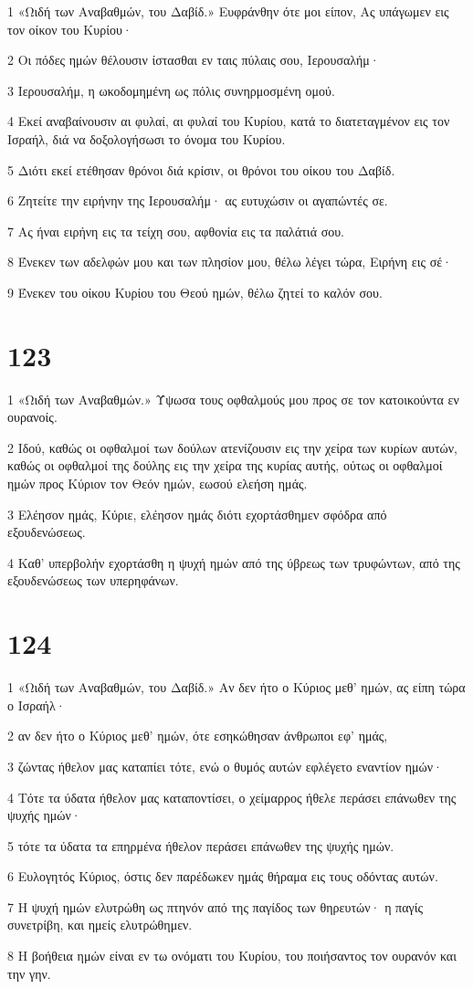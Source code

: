 \par 1 «Ωιδή των Αναβαθμών, του Δαβίδ.» Ευφράνθην ότε μοι είπον, Ας υπάγωμεν εις τον οίκον του Κυρίου·
\par 2 Οι πόδες ημών θέλουσιν ίστασθαι εν ταις πύλαις σου, Ιερουσαλήμ·
\par 3 Ιερουσαλήμ, η ωκοδομημένη ως πόλις συνηρμοσμένη ομού.
\par 4 Εκεί αναβαίνουσιν αι φυλαί, αι φυλαί του Κυρίου, κατά το διατεταγμένον εις τον Ισραήλ, διά να δοξολογήσωσι το όνομα του Κυρίου.
\par 5 Διότι εκεί ετέθησαν θρόνοι διά κρίσιν, οι θρόνοι του οίκου του Δαβίδ.
\par 6 Ζητείτε την ειρήνην της Ιερουσαλήμ· ας ευτυχώσιν οι αγαπώντές σε.
\par 7 Ας ήναι ειρήνη εις τα τείχη σου, αφθονία εις τα παλάτιά σου.
\par 8 Ένεκεν των αδελφών μου και των πλησίον μου, θέλω λέγει τώρα, Ειρήνη εις σέ·
\par 9 Ένεκεν του οίκου Κυρίου του Θεού ημών, θέλω ζητεί το καλόν σου.

\chapter{123}

\par 1 «Ωιδή των Αναβαθμών.» Ύψωσα τους οφθαλμούς μου προς σε τον κατοικούντα εν ουρανοίς.
\par 2 Ιδού, καθώς οι οφθαλμοί των δούλων ατενίζουσιν εις την χείρα των κυρίων αυτών, καθώς οι οφθαλμοί της δούλης εις την χείρα της κυρίας αυτής, ούτως οι οφθαλμοί ημών προς Κύριον τον Θεόν ημών, εωσού ελεήση ημάς.
\par 3 Ελέησον ημάς, Κύριε, ελέησον ημάς διότι εχορτάσθημεν σφόδρα από εξουδενώσεως.
\par 4 Καθ' υπερβολήν εχορτάσθη η ψυχή ημών από της ύβρεως των τρυφώντων, από της εξουδενώσεως των υπερηφάνων.

\chapter{124}

\par 1 «Ωιδή των Αναβαθμών, του Δαβίδ.» Αν δεν ήτο ο Κύριος μεθ' ημών, ας είπη τώρα ο Ισραήλ·
\par 2 αν δεν ήτο ο Κύριος μεθ' ημών, ότε εσηκώθησαν άνθρωποι εφ' ημάς,
\par 3 ζώντας ήθελον μας καταπίει τότε, ενώ ο θυμός αυτών εφλέγετο εναντίον ημών·
\par 4 Τότε τα ύδατα ήθελον μας καταποντίσει, ο χείμαρρος ήθελε περάσει επάνωθεν της ψυχής ημών·
\par 5 τότε τα ύδατα τα επηρμένα ήθελον περάσει επάνωθεν της ψυχής ημών.
\par 6 Ευλογητός Κύριος, όστις δεν παρέδωκεν ημάς θήραμα εις τους οδόντας αυτών.
\par 7 Η ψυχή ημών ελυτρώθη ως πτηνόν από της παγίδος των θηρευτών· η παγίς συνετρίβη, και ημείς ελυτρώθημεν.
\par 8 Η βοήθεια ημών είναι εν τω ονόματι του Κυρίου, του ποιήσαντος τον ουρανόν και την γην.

